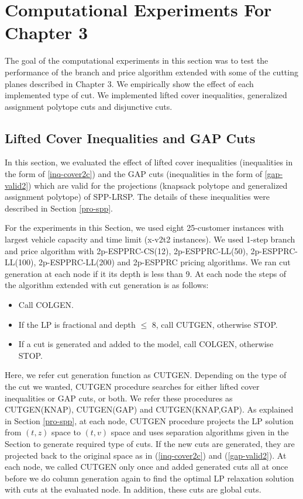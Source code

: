 

\section{Computational Experiments For Chapter 3}
The goal of the computational experiments in this section was
to test the performance of the branch and price algorithm extended with
some of the cutting planes described in Chapter 3. We empirically show the
effect of each implemented type of cut. We implemented lifted cover
inequalities, generalized assignment polytope cuts and disjunctive cuts.

\subsection{Lifted Cover Inequalities and GAP Cuts}
\label{comp:CoverGAP}
In this section, we evaluated the effect of lifted cover inequalities
(inequalities in the form of \ref{inq-cover2c}) and the GAP cuts
(inequalities in the form of \ref{gap-valid2}) which are valid for
the projections (knapsack polytope and generalized assignment polytope)
of SPP-LRSP. The details of these inequalities were described in Section
\ref{pro-spp}.

For the experiments in this Section, we used eight 25-customer instances
with largest vehicle capacity and time limit (x-v2t2 instances).
We used 1-step branch and price algorithm with 2p-ESPPRC-CS(12),
2p-ESPPRC-LL(50),  2p-ESPPRC-LL(100), 2p-ESPPRC-LL(200) and
2p-ESPPRC pricing algorithms. We ran cut generation at each node if it
its depth is less than 9. At each node the steps of the algorithm extended
with cut generation is as follows:
\begin{itemize}
\item Call COLGEN.
\item If the LP is fractional and depth $\leq$ 8, call CUTGEN, otherwise STOP.
\item If a cut is generated and added to the model, call COLGEN,
otherwise STOP.
 \end{itemize}
Here, we refer cut generation function as CUTGEN. Depending on the type of
the cut we wanted, CUTGEN procedure searches for either lifted cover inequalities
or GAP cuts, or both. We refer these procedures as CUTGEN(KNAP),
CUTGEN(GAP) and CUTGEN(KNAP,GAP). As explained in Section \ref{pro-spp},
at each node, CUTGEN procedure projects the LP solution from $(t,z)$ space to
$(t,v)$ space and uses separation algorithms given in the Section to generate
required type of cuts. If the new cuts are generated, they are
projected back to the original space as in (\ref{inq-cover2c}) and (\ref{gap-valid2}).
At each node, we called CUTGEN only once and added
generated cuts all at once before we do column generation again to find
the optimal LP relaxation solution with cuts at the evaluated node.
In addition, these cuts are global cuts.

